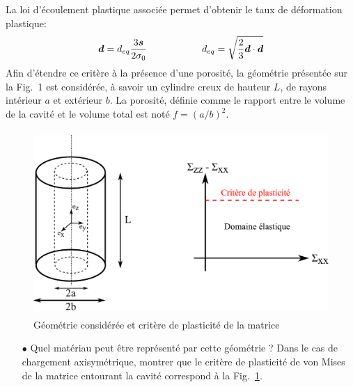 \documentclass[french,english,12pt]{exam}
\begin{document}
La loi d'écoulement plastique associée permet d'obtenir le taux de déformation plastique:
\begin{equation}
  \boldsymbol{d} = d_{eq} \frac{3 \boldsymbol{s}}{2 \sigma_0}  \hspace{2cm} d_{eq} = \sqrt{\frac{2}{3}\boldsymbol{d} \cdot \boldsymbol{d} }
  \label{eq200}
\end{equation}
\noindent
Afin d'étendre ce critère à la présence d'une porosité, la géométrie présentée sur la Fig.~1 est considérée, à savoir un cylindre creux de hauteur $L$, de rayons intérieur $a$ et extérieur $b$. La porosité, définie comme le rapport entre le volume de la cavité et le volume total est noté $f = (a/b)^2$.
\begin{figure}[H]
  \centering
  \includegraphics[height = 7cm]{homoMEALOR.pdf}
\caption{Géométrie considérée et critère de plasticité de la matrice}
\label{fig1}
\end{figure}

\begin{itemize}
\item[$\bullet$] Quel matériau peut être représenté par cette géométrie ? Dans le cas de chargement axisymétrique, montrer que le critère de plasticité de von Mises de la matrice entourant la cavité correspond à la Fig.~\ref{fig1}.\\
\end{itemize}
\noindent
\end{document}
